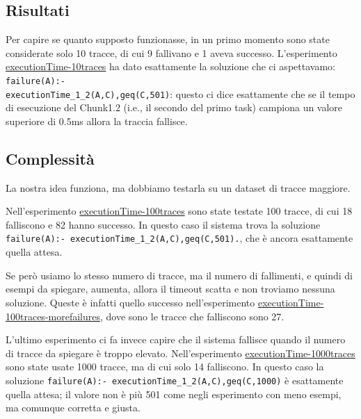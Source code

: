 \subsection{Risultati}
Per capire se quanto supposto funzionasse, in un primo momento sono state considerate solo 10 tracce, di cui 9 fallivano e 1 aveva successo. L'esperimento \href{https://github.com/edoardosarri24/prediction-in-data-driven-system/tree/main/my-experiments/8-executionTime-10traces}{executionTime-10traces} ha dato esattamente la soluzione che ci aspettavamo: \texttt{failure(A):- \\ executionTime\_1\_2(A,C),geq(C,501)}: questo ci dice esattamente che se il tempo di esecuzione del Chunk1.2 (i.e., il secondo del primo task) campiona un valore superiore di 0.5ms allora la traccia fallisce.

\subsection{Complessità}
La nostra idea funziona, ma dobbiamo testarla su un dataset di tracce maggiore.

Nell'esperimento \href{https://github.com/edoardosarri24/prediction-in-data-driven-system/tree/main/my-experiments/9-executionTime-100traces}{executionTime-100traces} sono state testate 100 tracce, di cui 18 falliscono e 82 hanno successo. In questo caso il sistema trova la soluzione \texttt{failure(A):- executionTime\_1\_2(A,C),geq(C,501).}, che è ancora esattamente quella attesa.

Se però usiamo lo stesso numero di tracce, ma il numero di fallimenti, e quindi di esempi da spiegare, aumenta, allora il timeout scatta e non troviamo nessuna soluzione. Queste è infatti quello successo nell'esperimento \href{https://github.com/edoardosarri24/prediction-in-data-driven-system/tree/main/my-experiments/10-executionTime-100traces-morefailures}{executionTime-100traces-morefailures}, dove sono le tracce che falliscono sono 27.

L'ultimo esperimento ci fa invece capire che il sistema fallisce quando il numero di tracce da spiegare è troppo elevato. Nell'esperimento \href{https://github.com/edoardosarri24/prediction-in-data-driven-system/tree/main/my-experiments/11-executionTime-1000traces}{executionTime-1000traces} sono state usate 1000 tracce, ma di cui solo 14 falliscono. In questo caso la soluzione \texttt{failure(A):- executionTime\_1\_2(A,C),geq(C,1000)} è esattamente quella attesa; il valore non è più 501 come negli esperimento con meno esempi, ma comunque corretta e giusta.

